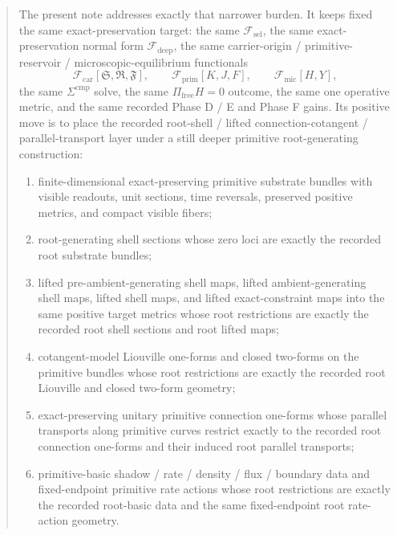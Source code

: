 \documentclass[11pt]{article}
\newcommand{\GaugeAux}{Y}
\newcommand{\MicFunctional}{\mathscr F_{\mathrm{mic}}}
\newcommand{\PrimFunctional}{\mathscr F_{\mathrm{prim}}}
\newcommand{\CarrierFunctional}{\mathscr F_{\mathrm{car}}}
\newcommand{\DeepFunctional}{\mathscr F_{\mathrm{deep}}}
\newcommand{\StemFunctional}{\mathscr F_{\mathrm{sel}}}
\newcommand{\PrimStrain}{K}
\newcommand{\PrimNeutral}{J}
\newcommand{\PrimFree}{F}
\newcommand{\CarrierSeed}{\mathfrak S}
\newcommand{\RelabelSeed}{\mathfrak R}
\newcommand{\FreeSeed}{\mathfrak F}
\begin{document}
\begin{abstract}
The present note addresses exactly that narrower burden. It keeps fixed the same exact-preservation target: the same \(\StemFunctional\), the same exact-preservation normal form \(\DeepFunctional\), the same carrier-origin / primitive-reservoir / microscopic-equilibrium functionals
\[
\CarrierFunctional[\CarrierSeed,\RelabelSeed,\FreeSeed],\qquad
\PrimFunctional[\PrimStrain,\PrimNeutral,\PrimFree],\qquad
\MicFunctional[H,\GaugeAux],
\]
the same \(\Sigma^{\mathrm{cmp}}\) solve, the same \(\Pi_{\mathrm{free}}H=0\) outcome, the same one operative metric, and the same recorded Phase D / E and Phase F gains. Its positive move is to place the recorded root-shell / lifted connection-cotangent / parallel-transport layer under a still deeper primitive root-generating construction:
\begin{enumerate}
    \item finite-dimensional exact-preserving primitive substrate bundles with visible readouts, unit sections, time reversals, preserved positive metrics, and compact visible fibers;
    \item root-generating shell sections whose zero loci are exactly the recorded root substrate bundles;
    \item lifted pre-ambient-generating shell maps, lifted ambient-generating shell maps, lifted shell maps, and lifted exact-constraint maps into the same positive target metrics whose root restrictions are exactly the recorded root shell sections and root lifted maps;
    \item cotangent-model Liouville one-forms and closed two-forms on the primitive bundles whose root restrictions are exactly the recorded root Liouville and closed two-form geometry;
    \item exact-preserving unitary primitive connection one-forms whose parallel transports along primitive curves restrict exactly to the recorded root connection one-forms and their induced root parallel transports;
    \item primitive-basic shadow / rate / density / flux / boundary data and fixed-endpoint primitive rate actions whose root restrictions are exactly the recorded root-basic data and the same fixed-endpoint root rate-action geometry.
\end{enumerate}


\end{abstract}
\end{document}
